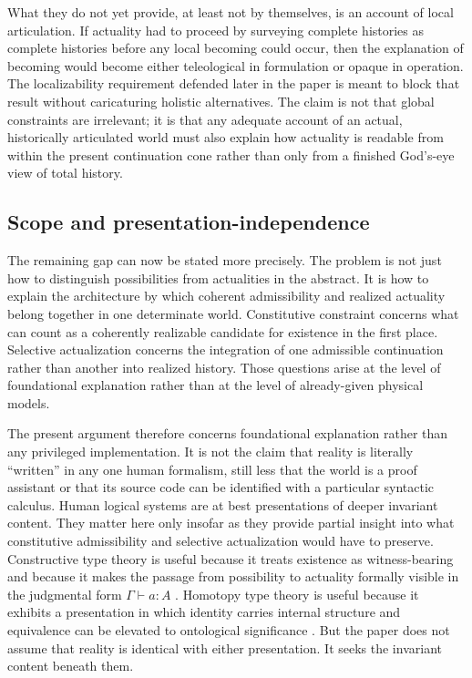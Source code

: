 \documentclass[11pt]{article}
\theoremstyle{foundation}
\begin{document}
What they do not yet provide, at least not by themselves, is an account of local articulation. If actuality had to proceed by surveying complete histories as complete histories before any local becoming could occur, then the explanation of becoming would become either teleological in formulation or opaque in operation. The localizability requirement defended later in the paper is meant to block that result without caricaturing holistic alternatives. The claim is not that global constraints are irrelevant; it is that any adequate account of an actual, historically articulated world must also explain how actuality is readable from within the present continuation cone rather than only from a finished God's-eye view of total history.

\subsection{Scope and presentation-independence}

The remaining gap can now be stated more precisely. The problem is not just how to distinguish possibilities from actualities in the abstract. It is how to explain the architecture by which coherent admissibility and realized actuality belong together in one determinate world. Constitutive constraint concerns what can count as a coherently realizable candidate for existence in the first place. Selective actualization concerns the integration of one admissible continuation rather than another into realized history. Those questions arise at the level of foundational explanation rather than at the level of already-given physical models.

The present argument therefore concerns foundational explanation rather than any privileged implementation. It is not the claim that reality is literally ``written'' in any one human formalism, still less that the world is a proof assistant or that its source code can be identified with a particular syntactic calculus. Human logical systems are at best presentations of deeper invariant content. They matter here only insofar as they provide partial insight into what constitutive admissibility and selective actualization would have to preserve. Constructive type theory is useful because it treats existence as witness-bearing and because it makes the passage from possibility to actuality formally visible in the judgmental form $\Gamma \vdash a : A$ \citep{MartinLof1984}. Homotopy type theory is useful because it exhibits a presentation in which identity carries internal structure and equivalence can be elevated to ontological significance \citep{UF2013}. But the paper does not assume that reality is identical with either presentation. It seeks the invariant content beneath them.
\end{document}
